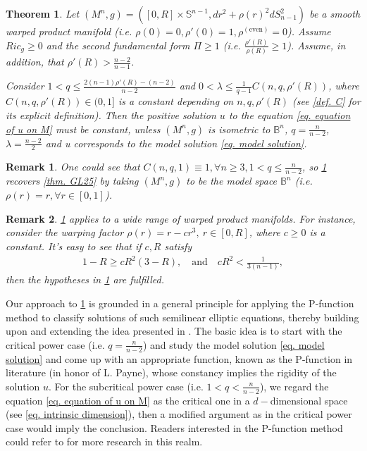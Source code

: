 \documentclass[12pt]{amsart}%
\newtheorem{theorem}{Theorem}
\newtheorem{remark}{Remark}
\numberwithin{equation}{section}
\numberwithin{lemma}{section}
\numberwithin{proposition}{section}
\numberwithin{corollary}{section}
\numberwithin{remark}{section}
\begin{document}
\begin{theorem}\label{thm. C. warped product}
    Let $(M^n,g)
        =([0,R]\times \mathbb{S}^{n-1},dr^2+\rho(r)^2dS_{n-1}^2)$ be a smooth warped product manifold (i.e. $\rho(0)=0,\rho'(0)=1, \rho^{(\text{even})}=0$). Assume $Ric_g\geq 0$ and the second fundamental form $\Pi\geq 1$ (i.e. $\frac{\rho'(R)}{\rho(R)}\geq 1$). Assume, in addition, that $\rho'(R)>\frac{n-2}{n-1}$.

        Consider $1<q\leq \frac{2(n-1)\rho'(R)-(n-2)}{n-2}$ and  $0<\lambda\leq
        \frac{1}{q-1}C(n,q,\rho'(R))$, where $C(n,q,\rho'(R))\in(0,1]$ is a constant depending on $n,q,\rho'(R)$ (see \cref{def. C} for its explicit definition).
        Then the positive solution $u$ to the equation \cref{eq. equation of u on M} must be constant, unless $(M^n,g)$ is isometric to $\mathbb{B}^n$, $q=\frac{n}{n-2}$, $\lambda=\frac{n-2}{2}$ and u corresponds to the model solution \cref{eq. model solution}.
\end{theorem}
\begin{remark}
    One could see that $C(n,q,1)\equiv 1, \forall n\geq 3, 1<q\leq \frac{n}{n-2}$, so \cref{thm. C. warped product} recovers \cref{thm. GL25} by taking $(M^n,g)$ to be the model space $\mathbb{B}^n$ (i.e. $\rho(r)=r,\forall r\in[0,1]$).
\end{remark}
\begin{remark}
    \cref{thm. C. warped product} applies to a wide range of warped product manifolds. For instance,
    consider the warping factor $\rho(r)=r-cr^3,\ r\in [0,R]$, where $c\geq 0$ is a constant. It's easy to see that if $c,R$ satisfy
    \begin{align*}
    1-R\geq cR^2(3-R)
    ,\quad \text{and}\quad 
        cR^2<\frac{1}{3(n-1)},
    \end{align*}
    then the hypotheses in \cref{thm. C. warped product} are fulfilled.
\end{remark}

Our approach to \cref{thm. C. warped product} is grounded in a general principle for applying the P-function method to classify solutions of such semilinear elliptic equations, thereby building upon and extending the idea presented in \cite{Wan22}. 
The basic idea is to start with the critical power case (i.e. $q=\frac{n}{n-2}$) and study the model solution \cref{eq. model solution} and come up with an appropriate function, known as the P-function in literature (in honor of L. Payne), whose constancy implies the rigidity of the solution $u$. For the subcritical power case (i.e. $1<q<\frac{n}{n-2}$), we regard the equation \cref{eq. equation of u on M} as the critical one in a $d-$dimensional space (see \cref{eq. intrinsic dimension}), then a modified argument as in the critical power case would  imply the conclusion. Readers interested in the P-function method could refer to \cite{Pay68,Wei71,Dan11,CFP24} for more research in  this realm.
\end{document}
